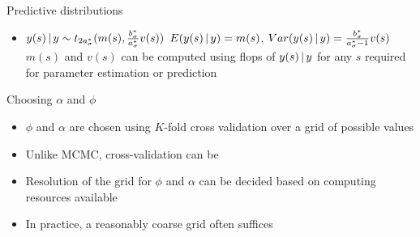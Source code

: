 \begin{frame}{Predictive distributions}
\begin{itemize}
\item $y(s) \,|\, y \sim t_{2a_\sigma^*}{(m(s) , \frac{b_\sigma^*}{a_\sigma^*} v(s)})$
\myitem $E(y(s) \,|\, y) = m(s)$, $Var(y(s) \,|\, y) = \frac{b_\sigma^*}{a_\sigma^*{-1}} v(s)$
\myitem $m(s)$ and $v(s)$ can be computed using  flops
\myitem {} of $y(s) \,|\, y$ for any $s$
\myitem {} required for parameter estimation or prediction
\end{itemize}
\end{frame}

\begin{frame}{Choosing $\alpha$ and $\phi$}
\begin{itemize}
\item $\phi$ and $\alpha$ are chosen using $K$-fold \alert{cross validation} over a grid of possible values
\item Unlike MCMC, cross-validation can be 
\item Resolution of the grid for $\phi$ and $\alpha$ can be decided based on computing resources available 
\item In practice, a reasonably coarse grid often suffices 
\end{itemize}
\end{frame}

